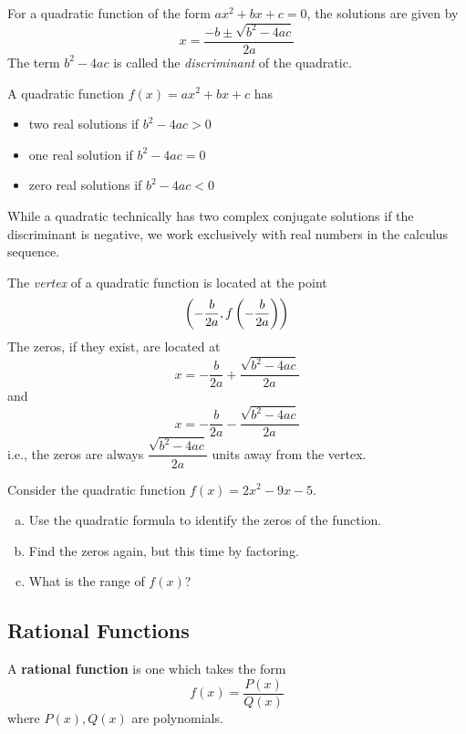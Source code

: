 \documentclass[notes]{subfiles}
\begin{document}
	 	\begin{rmk}
	 		For a quadratic function of the form \(ax^2 + bx + c = 0\), the solutions are given by 
	 			\[x = \dfrac{-b \pm \sqrt{b^2 -4ac}}{2a}\]
			The term \(b^2-4ac\) is called the \emph{discriminant} of the quadratic.
	 	\end{rmk}
	 	
	 	\begin{rmk}
	 		A quadratic function \(f(x) = ax^2 + bx + c\) has
	 		\begin{itemize}
	 			\item two real solutions if \(b^2-4ac > 0\)
	 			\item one real solution if \(b^2-4ac = 0\)
	 			\item zero real solutions if \(b^2-4ac < 0\)
	 		\end{itemize}
	 		While a quadratic technically has two complex conjugate solutions if the discriminant is negative, we work exclusively with real numbers in the calculus sequence.
	 	\end{rmk}
	 	
	 	\begin{rmk}
	 		The \emph{vertex} of a quadratic function is located at the point
	 			\[\left( -\dfrac{b}{2a},f\left( -\dfrac{b}{2a}\right)\right)\]
			The zeros, if they exist, are located at 
				\[x = -\dfrac{b}{2a} + \dfrac{\sqrt{b^2-4ac}}{2a}\]
				and
				\[x = -\dfrac{b}{2a} - \dfrac{\sqrt{b^2-4ac}}{2a}\]
			i.e., the zeros are always \(\dfrac{\sqrt{b^2-4ac}}{2a}\) units away from the vertex.
	 	\end{rmk}
	 	\begin{ex}
	 		Consider the quadratic function \(f(x) = 2x^2 -9x -5\). 
	 		\begin{enumerate}[(a)]
	 			\item Use the quadratic formula to identify the zeros of the function.
	 				\newpage
	 				
				\item Find the zeros again, but this time by factoring.
					
				\item What is the range of \(f(x)\)?
	 		\end{enumerate}
	 	\end{ex}
	 	
	\subsection*{Rational Functions}
		\begin{defn}
			A \textbf{rational function} is one which takes the form
				\[f(x) = \dfrac{P(x)}{Q(x)}\]
			where \(P(x),Q(x)\) are polynomials.
		\end{defn}
		
\end{document}
